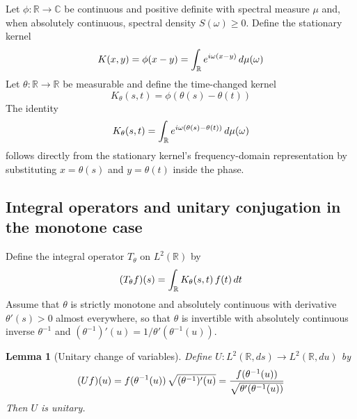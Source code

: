 \documentclass{article}
\newtheorem{lemma}{Lemma}
\begin{document}
Let $\phi : \mathbb{R} \to \mathbb{C}$ be continuous and positive definite
with spectral measure $\mu$ and, when absolutely continuous, spectral density
$S (\omega) \ge 0$. Define the stationary kernel
\begin{equation}
  K (x, y) = \phi (x - y) = \int_{\mathbb{R}} e^{i \omega (x - y)} 
  \hspace{0.17em} d \mu (\omega)
\end{equation}
Let $\theta : \mathbb{R} \to \mathbb{R}$ be measurable and define the
time-changed kernel
\begin{equation}
  K_{\theta} (s, t) = \phi (\theta (s) - \theta (t))
\end{equation}
The identity
\begin{equation}
  K_{\theta} (s, t) = \int_{\mathbb{R}} e^{i \omega (\theta (s) - \theta (t))}
  \hspace{0.17em} d \mu (\omega)
\end{equation}
follows directly from the stationary kernel's frequency-domain representation
by substituting $x = \theta (s)$ and $y = \theta (t)$ inside the phase.

\subsection{Integral operators and unitary conjugation in the monotone case}

Define the integral operator $T_{\theta}$ on $L^2 (\mathbb{R})$ by
\begin{equation}
  (T_{\theta} f) (s) = \int_{\mathbb{R}} K_{\theta} (s, t)  \hspace{0.17em} f
  (t)  \hspace{0.17em} dt
\end{equation}
Assume that $\theta$ is strictly monotone and absolutely continuous with
derivative $\theta' (s) > 0$ almost everywhere, so that $\theta$ is invertible
with absolutely continuous inverse $\theta^{- 1}$ and $(\theta^{- 1})' (u) = 1
/ \theta' (\theta^{- 1} (u))$.

\begin{lemma}[Unitary change of variables]
  Define $U : L^2 (\mathbb{R}, ds) \to L^2 (\mathbb{R}, du)$ by
  \begin{equation}
    (Uf) (u) = f (\theta^{- 1} (u)) \hspace{0.17em} \sqrt{(\theta^{- 1})' (u)}
    = \frac{f (\theta^{- 1} (u))}{\sqrt{\theta' (\theta^{- 1} (u))}}
  \end{equation}
  Then $U$ is unitary.
\end{lemma}
\end{document}
